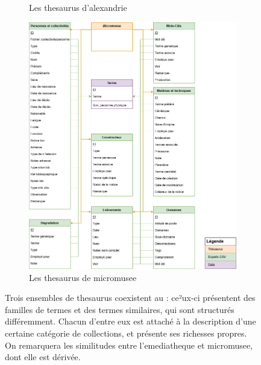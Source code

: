 \begin{figure}[htbp]
\begin{subfigure}{0.45\textwidth}
		\caption{Les \gls{thesaurus} d'\gls{alexandrie}}
		\label{uml:alexandrie}
	\end{subfigure}
	\hfill
	\begin{subfigure}{0.5\textwidth}
		\centering
		\includegraphics[width=\linewidth]{img/UML_micromusee}
		\caption{Les \gls{thesaurus} de \gls{micromusee}}
		\label{uml:micromusee}
	\end{subfigure}
	\caption[Construction des \gls{thesaurus} du \mae]{Trois ensembles de \gls{thesaurus} coexistent au \mae : ce²ux-ci présentent des familles de termes et des termes similaires, qui sont structurés différemment. Chacun d'entre eux est attaché à la description d'une certaine catégorie de collections, et présente ses richesses propres. On remarquera les similitudes entre l'\gls{emediatheque} et \gls{micromusee}, dont elle est dérivée.}
	\label{fig:thesaurusmusee}
\end{figure}



\bigskip

